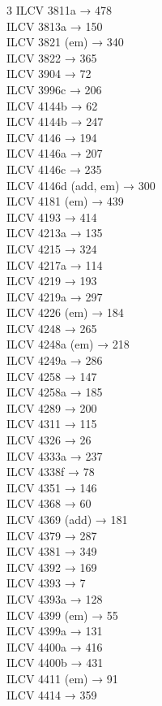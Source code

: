 \begin{multicols}{3}
ILCV 3811a → 478\\
ILCV 3813a → 150\\
ILCV 3821 (em) → 340\\
ILCV 3822 → 365\\
ILCV 3904 → 72\\
ILCV 3996c → 206\\
ILCV 4144b → 62\\
ILCV 4144b → 247\\
ILCV 4146 → 194\\
ILCV 4146a → 207\\
ILCV 4146c → 235\\
ILCV 4146d (add, em) → 300\\
ILCV 4181 (em) → 439\\
ILCV 4193 → 414\\
ILCV 4213a → 135\\
ILCV 4215 → 324\\
ILCV 4217a → 114\\
ILCV 4219 → 193\\
ILCV 4219a → 297\\
ILCV 4226 (em) → 184\\
ILCV 4248 → 265\\
ILCV 4248a (em) → 218\\
ILCV 4249a → 286\\
ILCV 4258 → 147\\
ILCV 4258a → 185\\
ILCV 4289 → 200\\
ILCV 4311 → 115\\
ILCV 4326 → 26\\
ILCV 4333a → 237\\
ILCV 4338f → 78\\
ILCV 4351 → 146\\
ILCV 4368 → 60\\
ILCV 4369 (add) → 181\\
ILCV 4379 → 287\\
ILCV 4381 → 349\\
ILCV 4392 → 169\\
ILCV 4393 → 7\\
ILCV 4393a → 128\\
ILCV 4399 (em) → 55\\
ILCV 4399a → 131\\
ILCV 4400a → 416\\
ILCV 4400b → 431\\
ILCV 4411 (em) → 91\\
ILCV 4414 → 359\\

\end{multicols}
